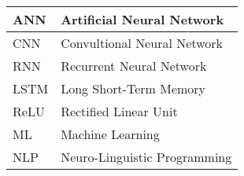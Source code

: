 



\begin{longtable}{p{90pt}l}
\hline ANN    	&\vline  Artificial Neural Network \\
\hline CNN      &\vline  Convultional Neural Network \\
\hline RNN      &\vline  Recurrent Neural Network\\
\hline LSTM     &\vline  Long Short-Term Memory\\
\hline ReLU     &\vline  Rectified Linear Unit \\
\hline ML       &\vline  Machine Learning \\
\hline NLP      &\vline  Neuro-Linguistic Programming\\

\hline 

\end{longtable}






